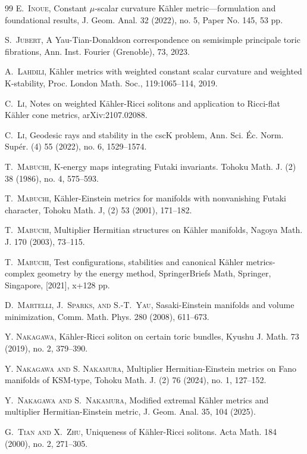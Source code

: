 \documentclass[12pt]{amsart}
\numberwithin{equation}{section}%
\theoremstyle{plain}
\theoremstyle{definition}
\newcommand{\1}{\mathbf{1}}
\begin{document}
\begin{thebibliography}{99}
\textsc{E.~Inoue},
Constant {$\mu$}-scalar curvature K\"ahler
metric---formulation and foundational results,
J. Geom. Anal. 32 (2022), no. 5, Paper No. 145, 53 pp.

\textsc{S.~Jubert},
A Yau-Tian-Donaldson correspondence on semisimple principale toric fibrations,
Ann. Inst. Fourier (Grenoble), 73, 2023.

\textsc{A.~Lahdili},
K\"ahler metrics with weighted constant scalar curvature
and weighted K-stability,
Proc. London Math. Soc., 119:1065--114, 2019.

\textsc{C.~Li},
Notes on weighted K\"ahler-Ricci solitons
and application to Ricci-flat K\"ahler cone metrics,
arXiv:2107.02088.

\textsc{C.~Li},
Geodesic rays and stability in the cscK problem,
Ann. Sci. \'Ec. Norm. Sup\'er. (4) 55 (2022), no. 6, 1529--1574.

\textsc{T.~Mabuchi},
K-energy maps integrating Futaki invariants.
Tohoku Math. J. (2) 38 (1986), no. 4, 575--593.

\textsc{T.~Mabuchi},
K\"{a}hler-Einstein metrics for manifolds with nonvanishing Futaki
character,
Tohoku Math. J, (2) 53 (2001), 171--182.

\textsc{T.~Mabuchi},
Multiplier Hermitian structures on K\"{a}hler manifolds, 
Nagoya Math. J. 170 (2003), 73--115.

\textsc{T.~Mabuchi},
Test configurations, stabilities and canonical K\"ahler metrics-complex geometry
by the energy method,
SpringerBriefs Math,
Springer, Singapore, [2021], x+128 pp.

\textsc{D.~Martelli, J.~Sparks, and S.-T.~Yau},
Sasaki-Einstein manifolds and volume minimization,
Comm. Math. Phys. 280 (2008), 611--673.

\textsc{Y. Nakagawa},
K\"{a}hler-Ricci soliton on certain toric bundles,
Kyushu J. Math. 73 (2019), no. 2, 379--390.

\textsc{Y. Nakagawa and S. Nakamura},
Multiplier Hermitian-Einstein metrics on Fano manifolds
of KSM-type,
Tohoku Math. J. (2) 76 (2024), no. 1, 127--152.

\textsc{Y.~Nakagawa and S.~Nakamura},
Modified extremal K\"ahler metrics
and multiplier Hermitian-Einstein metric,
J. Geom. Anal. 35, 104 (2025).

\textsc{G.~Tian and X.~Zhu},
Uniqueness of K\"ahler-Ricci solitons.
Acta Math. 184 (2000), no. 2, 271--305.

\end{thebibliography}
\end{document}
